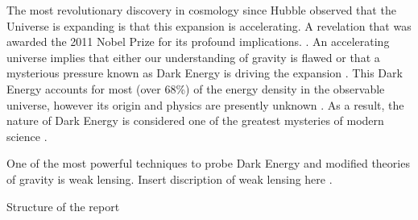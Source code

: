 The most revolutionary discovery in cosmology since 
Hubble observed that the Universe is expanding is that 
this expansion is accelerating. A revelation that was 
awarded the 2011 Nobel Prize for its profound 
implications. \cite{nobel}. An accelerating
universe implies that either our understanding of gravity is flawed 
or that a mysterious pressure known as Dark Energy is driving the 
expansion \cite{peebles}.
This Dark Energy accounts for most (over 68\%) of the energy density in the observable universe, 
however its origin and physics are presently unknown \cite{planck}. 
As a result, the nature of Dark Energy is considered one of the 
greatest mysteries of modern science \cite{pathfinder}.  
\par
One of the most powerful techniques to probe Dark Energy and modified theories of gravity is weak lensing. Insert discription of weak lensing here \cite{hoekstra,rachel_2018}.
\par
Structure of the report